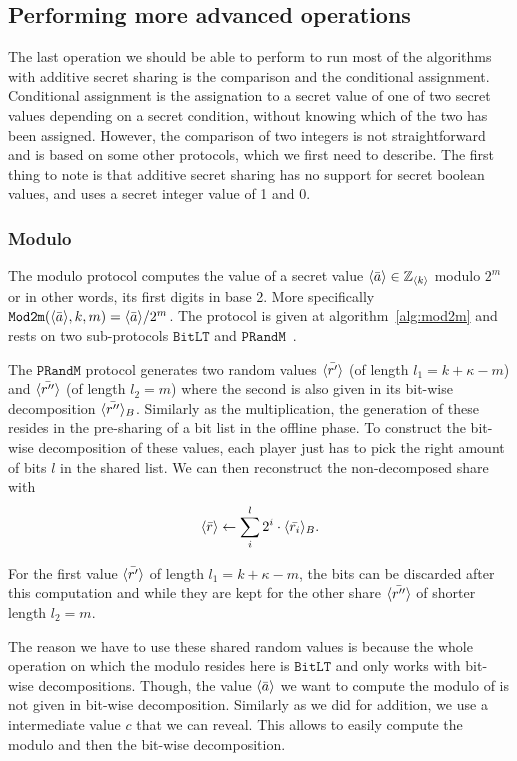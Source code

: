 \subsection{Performing more advanced operations}
The last operation we should be able to perform to run most of the algorithms with additive secret sharing is the comparison and the conditional assignment. Conditional assignment is the assignation to a secret value of one of two secret values depending on a secret condition, without knowing which of the two has been assigned. However, the comparison of two integers is not straightforward and is based on some other protocols, which we first need to describe. The first thing to note is that additive secret sharing has no support for secret boolean values, and uses a secret integer value of 1 and 0.

\subsubsection{Modulo}
The modulo protocol computes the value of a secret value $\langle \bar{a} \rangle \in \mathbb{Z}_{\langle k \rangle}$ modulo $2^m$ or in other words, its first digits in base 2. More specifically $\mathtt{Mod2m}(\langle \bar{a} \rangle,k,m) = \langle \bar{a} \rangle / 2^m$. The protocol is given at algorithm~\ref{alg:mod2m} and rests on two sub-protocols $\mathtt{BitLT}$ and $\mathtt{PRandM}$~\cite{Catrina2010ImprovedComputation,Aly2018SCALEDocumentation}. 

The $\mathtt{PRandM}$ protocol generates two random values $\langle \bar{r'} \rangle$ (of length $l_1 = k + \kappa -m$) and $\langle \bar{r''} \rangle$ (of length $l_2 = m$) where the second is also given in its bit-wise decomposition $\langle \bar{r''} \rangle_B$. Similarly as the multiplication, the generation of these resides in the pre-sharing of a bit list in the offline phase. To construct the bit-wise decomposition of these values, each player just has to pick the right amount of bits $l$ in the shared list. We can then reconstruct the non-decomposed share with
\begin{equation}
    \langle \bar{r} \rangle \leftarrow \sum_i^l 2^i \cdot \langle \bar{r_i} \rangle_B.
\end{equation}

For the first value $\langle \bar{r'} \rangle$ of length $l_1 = k + \kappa -m$, the bits can be discarded after this computation and while they are kept for the other share $\langle \bar{r''} \rangle$ of shorter length $l_2 = m$.

The reason we have to use these shared random values is because the whole operation on which the modulo resides here is $\mathtt{BitLT}$ and only works with bit-wise decompositions. Though, the value $\langle \bar{a} \rangle$ we want to compute the modulo of is not given in bit-wise decomposition. Similarly as we did for addition, we use a intermediate value $c$ that we can reveal. This allows to easily compute the modulo and then the bit-wise decomposition.


